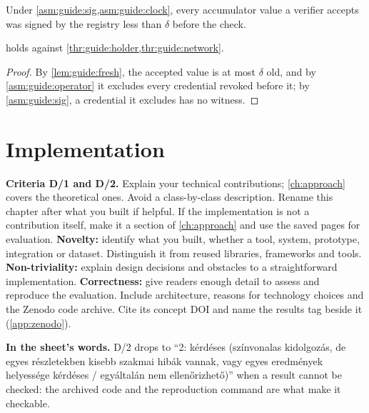 \begin{lemma}\label{lem:guide:fresh}
Under \cref{asm:guide:sig,asm:guide:clock}, every accumulator value a verifier accepts was signed by the registry less than $\delta$ before the check.
\end{lemma}
\begin{theorem}\label{thm:guide:stale}
 holds against \cref{thr:guide:holder,thr:guide:network}.
\end{theorem}
\begin{proof}
By \cref{lem:guide:fresh}, the accepted value is at most $\delta$ old, and by \cref{asm:guide:operator} it excludes every credential revoked before it; by \cref{asm:guide:sig}, a credential it excludes has no witness.
\end{proof}

\section{Implementation}\label{app:chapters:implementation}
\textbf{Criteria D/1 and D/2.} Explain your technical contributions; \cref{ch:approach} covers the theoretical ones. Avoid a class-by-class description. Rename this chapter after what you built if helpful. If the implementation is not a contribution itself, make it a section of \cref{ch:approach} and use the saved pages for evaluation.
\textbf{Novelty:} identify what you built, whether a tool, system, prototype, integration or dataset. Distinguish it from reused libraries, frameworks and tools.
\textbf{Non-triviality:} explain design decisions and obstacles to a straightforward implementation.
\textbf{Correctness:} give readers enough detail to assess and reproduce the evaluation. Include architecture, reasons for technology choices and the Zenodo code archive. Cite its concept DOI and name the results tag beside it (\cref{app:zenodo}).

\textbf{In the sheet's words.} D/2 drops to \enquote{2: kérdéses (színvonalas kidolgozás, de egyes részletekben kisebb szakmai hibák vannak, vagy egyes eredmények helyessége kérdéses / egyáltalán nem ellenőrizhető)} when a result cannot be checked: the archived code and the reproduction command are what make it checkable.

